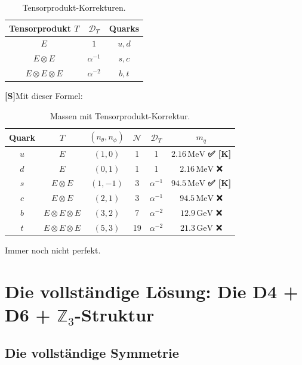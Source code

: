 \documentclass[11pt,a4paper]{article}
\newcommand{\Sstatus}{\textbf{[S]}}
\newcommand{\Checkmark}{\textbf{✅ [K]}}
\begin{document}
	\begin{table}[h!]
		\centering
		\caption{Tensorprodukt-Korrekturen.}
		\label{tab:tensor_corrections}
		\begin{tabular}{c c c}
			\toprule
			\textbf{Tensorprodukt $T$} & $\mathcal{D}_T$ & \textbf{Quarks} \\
			\midrule
			$E$ & $1$ & $u, d$ \\
			$E \otimes E$ & $\alpha^{-1}$ & $s, c$ \\
			$E \otimes E \otimes E$ & $\alpha^{-2}$ & $b, t$ \\
			\bottomrule
		\end{tabular}
	\end{table}
	
	\Sstatus Mit dieser Formel:
	
	\begin{table}[h!]
		\centering
		\caption{Massen mit Tensorprodukt-Korrektur.}
		\label{tab:tensor_masses}
		\begin{tabular}{c c c c c c}
			\toprule
			\textbf{Quark} & $T$ & $(n_\theta, n_\phi)$ & $\mathcal{N}$ & $\mathcal{D}_T$ & $m_q$ \\
			\midrule
			$u$ & $E$ & $(1, 0)$ & 1 & 1 & $2.16\,\text{MeV}$ \Checkmark \\
			$d$ & $E$ & $(0, 1)$ & 1 & 1 & $2.16\,\text{MeV}$ ❌ \\
			$s$ & $E \otimes E$ & $(1, -1)$ & 3 & $\alpha^{-1}$ & $94.5\,\text{MeV}$ \Checkmark \\
			$c$ & $E \otimes E$ & $(2, 1)$ & 3 & $\alpha^{-1}$ & $94.5\,\text{MeV}$ ❌ \\
			$b$ & $E \otimes E \otimes E$ & $(3, 2)$ & 7 & $\alpha^{-2}$ & $12.9\,\text{GeV}$ ❌ \\
			$t$ & $E \otimes E \otimes E$ & $(5, 3)$ & 19 & $\alpha^{-2}$ & $21.3\,\text{GeV}$ ❌ \\
			\bottomrule
		\end{tabular}
	\end{table}
	
	Immer noch nicht perfekt.
	
	\section{Die vollständige Lösung: Die D4 + D6 + $\mathbb{Z}_3$-Struktur}
	
	\subsection{Die vollständige Symmetrie}
	
\end{document}
